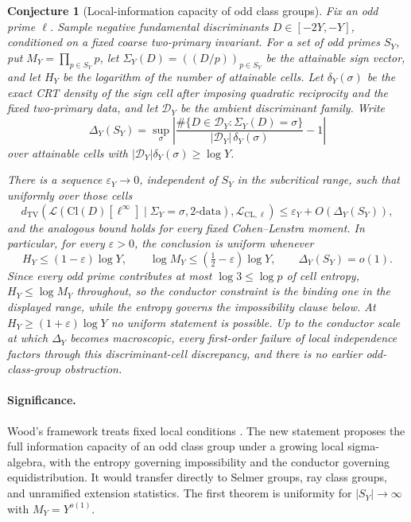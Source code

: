 \documentclass[11pt]{article}
\newtheorem{conjecture}{Conjecture}
\newcommand{\eps}{\varepsilon}
\begin{document}
\begin{conjecture}[Local-information capacity of odd class groups]\label{c10}
Fix an odd prime $\ell$.  Sample negative fundamental discriminants
$D\in[-2Y,-Y]$, conditioned on a fixed coarse two-primary invariant.  For a set of
odd primes $S_Y$, put $M_Y=\prod_{p\in S_Y}p$, let $\Sigma_Y(D)=((D/p))_{p\in S_Y}$ be the
attainable sign vector, and let $H_Y$ be the logarithm of the number of attainable cells.
Let $\delta_Y(\sigma)$ be the exact CRT density of the sign cell after imposing
quadratic reciprocity and the fixed two-primary data, and let $\mathcal D_Y$ be the
ambient discriminant family.  Write
\[
 \Delta_Y(S_Y)=\sup_\sigma
 \left|\frac{\#\{D\in\mathcal D_Y:\Sigma_Y(D)=\sigma\}}
 {|\mathcal D_Y|\,\delta_Y(\sigma)}-1\right|
\]
over attainable cells with $|\mathcal D_Y|\delta_Y(\sigma)\ge\log Y$.

There is a sequence $\varepsilon_Y\to0$, independent of $S_Y$ in the subcritical range,
such that uniformly over those cells
\[
 d_{\mathrm{TV}}\!\left(
 \mathcal L(\mathrm{Cl}(D)[\ell^\infty]\mid\Sigma_Y=\sigma,\text{2-data}),
 \mathcal L_{\mathrm{CL},\ell}\right)
 \le \varepsilon_Y+O(\Delta_Y(S_Y)),
\]
and the analogous bound holds for every fixed Cohen--Lenstra moment.  In particular,
for every $\eps>0$, the conclusion is uniform whenever
\[
 H_Y\le(1-\eps)\log Y,
 \qquad \log M_Y\le(\tfrac12-\eps)\log Y,
 \qquad \Delta_Y(S_Y)=o(1).
\]
Since every odd prime contributes at most $\log3\le\log p$ of cell entropy,
$H_Y\le\log M_Y$ throughout, so
the conductor constraint is the binding one in the displayed range, while the entropy
governs the impossibility clause below.
At $H_Y\ge(1+\eps)\log Y$ no uniform statement is possible.  Up to the conductor scale
at which $\Delta_Y$ becomes macroscopic, every first-order failure of local independence
factors through this discriminant-cell discrepancy, and there is no earlier
odd-class-group obstruction.
\end{conjecture}

\paragraph{Significance.}
Wood's framework treats fixed local conditions \cite{Wood}.  The new statement proposes
the full information capacity of an odd class group under a growing local sigma-algebra,
with the entropy governing impossibility and the conductor governing
equidistribution.  It would transfer directly
to Selmer groups, ray class groups, and unramified extension statistics.  The first
theorem is uniformity for $|S_Y|\to\infty$ with $M_Y=Y^{o(1)}$.
\end{document}
